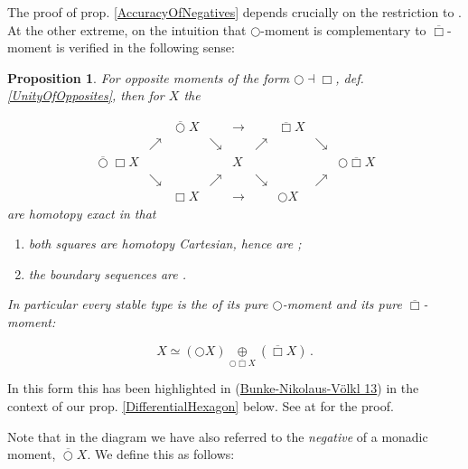 \documentclass[12pt,titlepage]{article}
\newcommand{\itexarray}[1]{\begin{matrix}#1\end{matrix}}
\theoremstyle{plain}
\newtheorem{prop}{Proposition}
\theoremstyle{definition}
\theoremstyle{remark}
\begin{document}
The proof of prop. \ref{AccuracyOfNegatives} depends crucially on the restriction to . At the other extreme, on  the intuition that $\bigcirc$-moment is complementary to $\overline{\Box}$-moment is verified in the following sense:

\begin{prop}
\label{TheHexagon}\hypertarget{TheHexagon}{}
For opposite moments of the form $\bigcirc \dashv \Box$, def. \ref{UnityOfOpposites}, then for  $X$ the 

\begin{displaymath}
\itexarray{
    && \overline{\bigcirc} X && \longrightarrow && \overline{\Box} X
    \\
    &\nearrow& &\searrow& & \nearrow && \searrow
    \\
    \overline{\bigcirc} \Box X && && X && && \bigcirc \overline{\Box} X
    \\
    &\searrow& &\nearrow & & \searrow && \nearrow
    \\
    && \Box X && \longrightarrow && \bigcirc X
  }
\end{displaymath}
are homotopy exact in that

\begin{enumerate}%
\item both squares are homotopy Cartesian, hence are ;


\item the boundary sequences are .



\end{enumerate}
In particular every stable type is the  of its pure $\bigcirc$-moment and its pure $\overline{\Box}$-moment:

\begin{displaymath}
X \simeq (\bigcirc X) \underset{\bigcirc \overline{\Box} X}{\oplus} (\overline{\Box} X)
  \,.
\end{displaymath}
\end{prop}
In this form this has been highlighted in (\hyperlink{BunkeNikolausVoelkl13}{Bunke-Nikolaus-Völkl 13}) in the context of our prop. \ref{DifferentialHexagon} below. See at  for the proof.

Note that in the diagram we have also referred to the \emph{negative} of a monadic moment, $\overline{\bigcirc} X$. We define this as follows:
\end{document}

